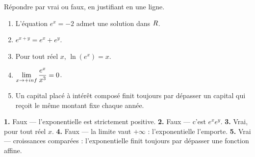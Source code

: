 \begin{jemeteste}
Répondre par vrai ou faux, en justifiant en une ligne.

\begin{enumerate}[label=\textbf{\arabic*.}, leftmargin=*, itemsep=0.28em]
  \item L'équation $e^{x} = -2$ admet une solution dans $R$.
  \item $e^{x+y} = e^{x} + e^{y}$.
  \item Pour tout réel $x$, $\ln\left(e^{x}\right) = x$.
  \item $\limpinf \dfrac{e^{x}}{x^{3}} = 0$.
  \item Un capital placé à intérêt composé finit toujours par dépasser un
        capital qui reçoit le même montant fixe chaque année.
\end{enumerate}
\end{jemeteste}

\begin{corrige}[je me teste]
\textbf{1.} Faux — l'exponentielle est strictement positive.
\textbf{2.} Faux — c'est $e^{x}e^{y}$.
\textbf{3.} Vrai, pour tout réel $x$.
\textbf{4.} Faux — la limite vaut $+\infty$ : l'exponentielle l'emporte.
\textbf{5.} Vrai — croissances comparées : l'exponentielle finit toujours par
dépasser une fonction affine.
\end{corrige}

